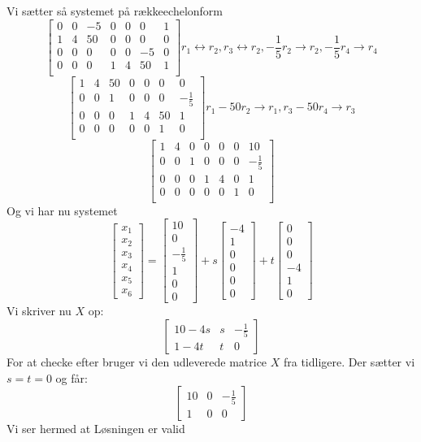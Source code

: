 \documentclass[a4paper,fleqn]{article}
\begin{document}
	Vi sætter så systemet på rækkeechelonform
	\[\begin{bmatrix}
		0&0&-5&0&0&0&1\\
		1&4&50&0&0&0&0\\
		0&0&0&0&0&-5&0\\
		0&0&0&1&4&50&1\\
\end{bmatrix} r_1 \leftrightarrow r_2, r_3 \leftrightarrow r_2, -\frac{1}{5}r_2 \rightarrow r_2, -\frac{1}{5}r_4 \rightarrow r_4\]
	\[\begin{bmatrix}
		1&4&50&0&0&0&0\\
		0&0&1&0&0&0&-\frac{1}{5}\\
		0&0&0&1&4&50&1\\
		0&0&0&0&0&1&0\\
	\end{bmatrix} r_1 - 50 r_2 \rightarrow r_1, r_3 - 50r_4 \rightarrow r_3\]
	\[\begin{bmatrix}
		1&4&0&0&0&0&10\\
		0&0&1&0&0&0&-\frac{1}{5}\\
		0&0&0&1&4&0&1\\
		0&0&0&0&0&1&0\\
	\end{bmatrix} \]
	Og vi har nu systemet
	\[
		\begin{bmatrix}x_1\\x_2\\x_3\\x_4\\x_5\\x_6\end{bmatrix} = 
		\begin{bmatrix}10\\0\\-\frac{1}{5}\\1\\0\\0\end{bmatrix} + s
		\begin{bmatrix}-4\\1\\0\\0\\0\\0\end{bmatrix} + t
		\begin{bmatrix}0\\0\\0\\-4\\1\\0\end{bmatrix}
	\]
	Vi skriver nu $X$ op:
	\[
	\begin{bmatrix}
	10-4s & s & -\frac{1}{5}\\ 1 -4t & t & 0
	\end{bmatrix}
	\]
	For at checke efter bruger vi den udleverede matrice $X$ fra tidligere. Der sætter vi 
	$s = t = 0$ og får:
	\[
		\begin{bmatrix}
			10 & 0 & -\frac{1}{5}\\
			1 & 0 & 0
		\end{bmatrix}
	\] Vi ser hermed at Løsningen er valid\\
\end{document}
